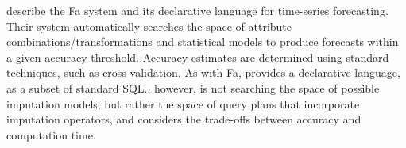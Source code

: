 \textcite*{duan2007processing} describe the Fa system and its declarative language for time-series forecasting. Their
system automatically searches the space of attribute combinations/transformations and statistical models
to produce forecasts within a given accuracy threshold. Accuracy estimates are determined using
standard techniques, such as cross-validation. 
As with Fa, \ProjectName{} provides a declarative language, as
a subset of standard SQL.\@ \ProjectName{}, however, is not searching the space of possible
imputation models, but rather the space of query plans that incorporate imputation operators,
and considers the trade-offs between accuracy and computation time.



